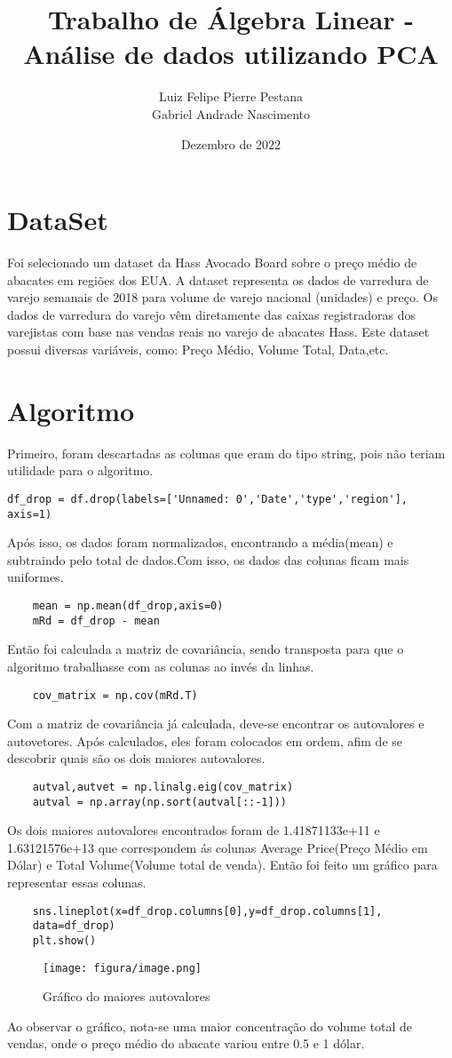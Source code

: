 \documentclass[a4paper,12pt]{article}
\title{Trabalho de Álgebra Linear - Análise de dados utilizando PCA}
\author{Luiz Felipe Pierre Pestana \\ Gabriel Andrade Nascimento}
\date{Dezembro de 2022}
\begin{document}
\maketitle

\section{DataSet}
    \par Foi selecionado um dataset da Hass Avocado Board sobre o preço médio de abacates em regiões dos EUA. A dataset representa os dados de varredura de varejo semanais de 2018 para volume de varejo nacional (unidades) e preço. Os dados de varredura do varejo vêm diretamente das caixas registradoras dos varejistas com base nas vendas reais no varejo de abacates Hass.
    Este dataset possui diversas variáveis, como: Preço Médio, Volume Total, Data,etc.
\section{Algoritmo}
    Primeiro, foram descartadas as colunas que eram do tipo string, pois não teriam utilidade para o algoritmo.
\begin{verbatim}
df_drop = df.drop(labels=['Unnamed: 0','Date','type','region'], axis=1)
\end{verbatim}
    Após isso, os dados foram normalizados, encontrando a média(mean) e subtraindo pelo
    total de dados.Com isso, os dados das colunas ficam mais uniformes.
\begin{verbatim}
    mean = np.mean(df_drop,axis=0)
    mRd = df_drop - mean
\end{verbatim}
    Então foi calculada a matriz de covariância, sendo transposta para que o algoritmo trabalhasse com as colunas ao invés da linhas.
\begin{verbatim}
    cov_matrix = np.cov(mRd.T)
\end{verbatim}
    Com a matriz de covariância já calculada, deve-se encontrar os autovalores e autovetores. Após calculados, eles foram colocados em ordem, afim de se descobrir quais são os dois maiores autovalores.
\begin{verbatim}
    autval,autvet = np.linalg.eig(cov_matrix)
    autval = np.array(np.sort(autval[::-1]))
\end{verbatim}
    Os dois maiores autovalores encontrados foram de 1.41871133e+11 e 1.63121576e+13 que correspondem ás colunas Average Price(Preço Médio em Dólar) e Total Volume(Volume total de venda).
    Então foi feito um gráfico para representar essas colunas.
\begin{verbatim}
    sns.lineplot(x=df_drop.columns[0],y=df_drop.columns[1],
    data=df_drop)
    plt.show()
\end{verbatim}
\begin{figure}[h]
    \caption{Gráfico do maiores autovalores}
    \centering
    \texttt{[image: figura/image.png]}
    \label{figura:my_label}
\end{figure}
    Ao observar o gráfico, nota-se uma maior concentração do volume total de vendas, onde o preço médio do abacate variou entre 0.5 e 1 dólar.
\end{document}

